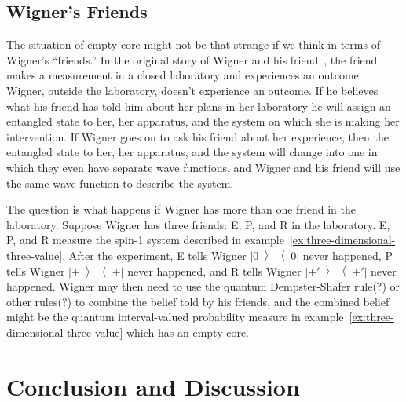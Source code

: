 \documentclass[12pt]{iopart}
\theoremstyle{plain}
\theoremstyle{definition}
\newcommand{\op}[2]{\ensuremath{\left\vert{#1}\middle\rangle\middle\langle{#2}\right\vert}}
\newcommand{\proj}[1]{\op{#1}{#1}}
\newcommand{\ps}{\texttt{+}}
\begin{document}


\subsection{Wigner's Friends}

The situation of empty core might not be that strange if we think
in terms of Wigner's ``friends.'' In the original story of Wigner
and his friend~\cite{Wigner1961,FuchsMerminSchack2014}, the friend
makes a measurement in a closed laboratory and experiences an outcome.
Wigner, outside the laboratory, doesn't experience an outcome. If
he believes what his friend has told him about her plans in her laboratory
he will assign an entangled state to her, her apparatus, and the system
on which she is making her intervention. If Wigner goes on to ask
his friend about her experience, then the entangled state to her,
her apparatus, and the system will change into one in which they even
have separate wave functions, and Wigner and his friend will use the
same wave function to describe the system.

The question is what happens if Wigner has more than one friend in
the laboratory. Suppose Wigner has three friends: E, P, and R in the
laboratory. E, P, and R measure the spin-1 system described in example~\ref{ex:three-dimensional-three-value}.
After the experiment, E tells Wigner $\proj{0}$ never happened, P
tells Wigner $\proj{\ps}$ never happened, and R tells Wigner $\proj{\ps'}$
never happened. Wigner may then need to use the quantum Dempster-Shafer
rule(?) or other rules(?) to combine the belief told by his friends,
and the combined belief might be the quantum interval-valued probability
measure in example~\ref{ex:three-dimensional-three-value} which
has an empty core.

\section{Conclusion and Discussion}
\end{document}
